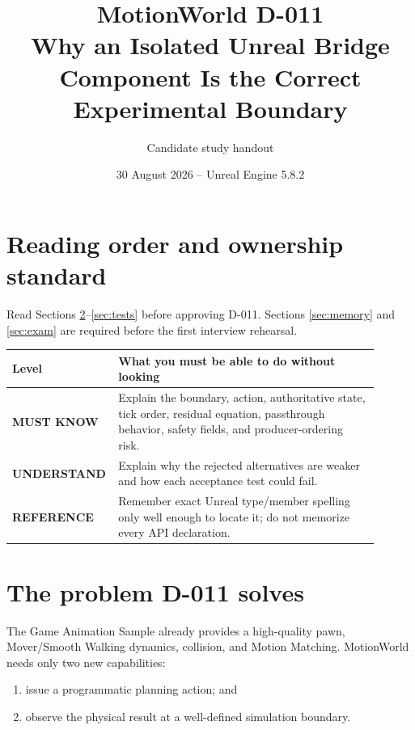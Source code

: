 \documentclass[11pt]{article}
\title{\vspace{-2em}\textbf{MotionWorld D-011}\\
\large Why an Isolated Unreal Bridge Component Is the Correct Experimental Boundary}
\author{Candidate study handout}
\date{30 August 2026 -- Unreal Engine 5.8.2}
\newcommand{\must}{\textcolor{mwred}{\textbf{MUST KNOW}}}
\newcommand{\understand}{\textcolor{mwgreen}{\textbf{UNDERSTAND}}}
\newcommand{\reference}{\textcolor{mwblue}{\textbf{REFERENCE}}}
\begin{document}
\maketitle
\pagestyle{fancy}

\begin{center}
\end{center}

\section{Reading order and ownership standard}

Read Sections \ref{sec:problem}--\ref{sec:tests} before approving D-011. Sections
\ref{sec:memory} and \ref{sec:exam} are required before the first interview rehearsal.

\begin{tabular}{>{\bfseries}p{0.20\linewidth}p{0.70\linewidth}}
\toprule
Level & What you must be able to do without looking \\
\midrule
\must & Explain the boundary, action, authoritative state, tick order, residual equation,
passthrough behavior, safety fields, and producer-ordering risk. \\
\understand & Explain why the rejected alternatives are weaker and how each acceptance test
could fail. \\
\reference & Remember exact Unreal type/member spelling only well enough to locate it; do not
memorize every API declaration. \\
\bottomrule
\end{tabular}

\section{The problem D-011 solves}\label{sec:problem}

The Game Animation Sample already provides a high-quality pawn, Mover/Smooth Walking dynamics,
collision, and Motion Matching. MotionWorld needs only two new capabilities:

\begin{enumerate}
  \item issue a programmatic planning action; and
  \item observe the physical result at a well-defined simulation boundary.
\end{enumerate}
\end{document}
